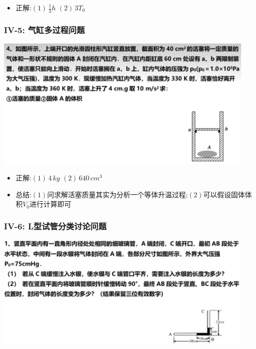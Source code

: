 \documentclass{article}
\begin{document}
\begin{itemize}
    \item 正解:\quad $(1) \, \frac{1}{3}h$  $(2) \, 3T_{0}$
\end{itemize}

\vspace{2em}

\subsubsection{IV-5: 气缸多过程问题}
\includegraphics[width = 0.95\textwidth,keepaspectratio]{./pictures/2.3-16.png}

\begin{itemize}
    \item 正解:\quad $(1) \, 4 \, kg$  $(2) \, 640 \, cm^{3}$
    \item 总结:\quad $(1)$问求解活塞质量其实为分析一个等体升温过程;$(2)$可以假设固体体积$V_{0}$进行计算即可
\end{itemize}

\vspace{2em}

\subsubsection{IV-6: L型试管分类讨论问题}
\includegraphics[width = 0.95\textwidth,keepaspectratio]{./pictures/2.3-17.png}
\end{document}
